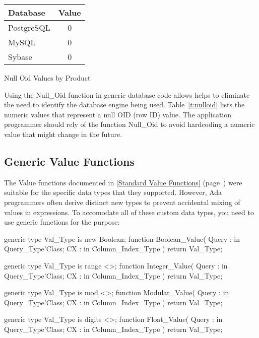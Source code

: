 \documentclass[english,letterpaper]{book}
\newcommand\Ref[1]{\textsection\ref{#1} (page~\pageref{#1})}
\begin{document}
\begin{floatingtable}{
   \begin{tabular}{lc}
      Database       &  Value\\
      \hline 
      PostgreSQL     &  0\\
      MySQL          &  0\\
      Sybase         &  0\\
   \end{tabular}}
   \caption{Null Oid Values by Product}\label{t:nulloid}
\end{floatingtable}

Using the Null\_Oid function in generic database code allows helps
to eliminate the need to identify the database engine being used. 
Table~\ref{t:nulloid} lists the numeric values that represent a 
null OID (row ID) value. The application programmer should rely
of the function Null\_Oid to avoid hardcoding a numeric value
that might change in the future.

\subsection{Generic Value Functions}

The Value functions documented in \Ref{Standard Value Functions}
were suitable for the specific data types that they supported. However,
Ada programmers often derive distinct new types to prevent accidental
mixing of values in expressions. To accomodate all of these custom
data types, you need to use generic functions for the purpose:

\begin{Code}
generic
   type Val_Type is new Boolean;
function Boolean_Value(
   Query : in Query_Type'Class;
   CX :    in Column_Index_Type
) return Val_Type;
\end{Code}

\begin{Code}
generic
   type Val_Type is range <>;
function Integer_Value(
   Query : in Query_Type'Class;
   CX :    in Column_Index_Type
) return Val_Type;
\end{Code}

\begin{Code}
generic
   type Val_Type is mod <>;
function Modular_Value(
   Query : in Query_Type'Class;
   CX :    in Column_Index_Type
) return Val_Type;
\end{Code}

\begin{Code}
generic
   type Val_Type is digits <>;
function Float_Value(
   Query : in Query_Type'Class;
   CX :    in Column_Index_Type
) return Val_Type;
\end{Code}
\end{document}
